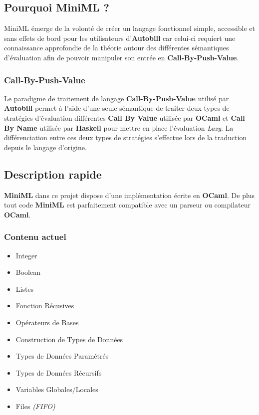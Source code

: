 \documentclass[
  12pt,
]{article}
\providecommand{\tightlist}{%
  \setlength{\itemsep}{0pt}\setlength{\parskip}{0pt}}
\begin{document}
\hypertarget{pourquoi-miniml}{%
\subsection{Pourquoi MiniML ?}\label{pourquoi-miniml}}

MiniML émerge de la volonté de créer un langage fonctionnel simple,
accessible et sans effets de bord pour les utilisateurs
d'\textbf{Autobill} car celui-ci requiert une connaissance approfondie
de la théorie autour des différentes sémantiques d'évaluation afin de
pouvoir manipuler son entrée en \textbf{Call-By-Push-Value}.

\hypertarget{call-by-push-value}{%
\subsubsection{Call-By-Push-Value}\label{call-by-push-value}}

Le paradigme de traitement de langage \textbf{Call-By-Push-Value}
utilisé par \textbf{Autobill} permet à l'aide d'une seule sémantique de
traiter deux types de stratégies d'évaluation différentes \textbf{Call
By Value} utilisée par \textbf{OCaml} et \textbf{Call By Name} utilisée
par \textbf{Haskell} pour mettre en place l'évaluation \emph{Lazy}. La
différenciation entre ces deux types de stratégies s'effectue lors de la
traduction depuis le langage d'origine.

\hypertarget{description-rapide}{%
\subsection{Description rapide}\label{description-rapide}}

\textbf{MiniML} dans ce projet dispose d'une implémentation écrite en
\textbf{OCaml}. De plus tout code \textbf{MiniML} est parfaitement
compatible avec un parseur ou compilateur \textbf{OCaml}.

\hypertarget{contenu-actuel}{%
\subsubsection{Contenu actuel}\label{contenu-actuel}}

\begin{itemize}
\tightlist
\item
  Integer
\item
  Boolean
\item
  Listes
\item
  Fonction Récusives
\item
  Opérateurs de Bases
\item
  Construction de Types de Données
\item
  Types de Données Paramétrés
\item
  Types de Données Récursifs
\item
  Variables Globales/Locales
\item
  Files \emph{(FIFO)}
\end{itemize}
\end{document}

